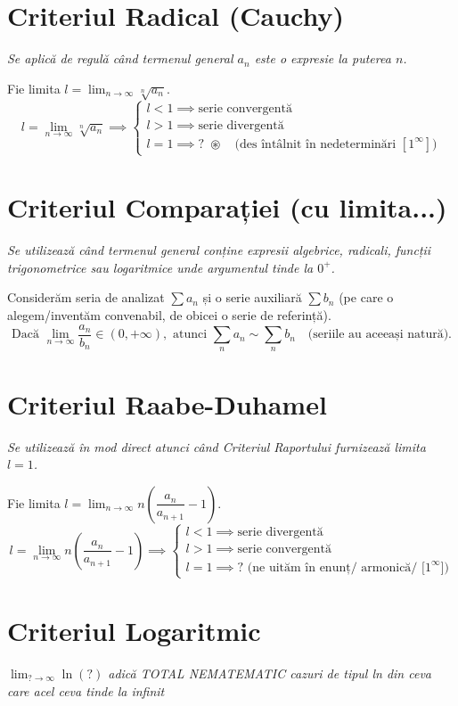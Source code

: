 \documentclass[12pt, a4paper]{report}
\begin{document}
	\section{Criteriul Radical (Cauchy)}
	\textit{Se aplică de regulă când termenul general $a_n$ este o expresie la puterea $n$.}
	
	Fie limita $l = \lim_{n \to \infty} \sqrt[n]{a_n}$.
	\[
	l = \lim_{n \to \infty} \sqrt[n]{a_n} \implies 
	\begin{cases} 
		l < 1 \implies \text{serie convergentă} \\ 
		l > 1 \implies \text{serie divergentă} \\ 
		l = 1 \implies \text{? } \circledast \quad \text{(des întâlnit în nedeterminări } [1^\infty]\text{)}
	\end{cases}
	\]
	
	\section{Criteriul Comparației (cu limita...)}
	\textit{Se utilizează când termenul general conține expresii algebrice, radicali, funcții trigonometrice sau logaritmice unde argumentul tinde la $0^+$.}
	
	Considerăm seria de analizat $\sum a_n$ și o serie auxiliară $\sum b_n$ (pe care o alegem/inventăm convenabil, de obicei o serie de referință).
	\[
	\text{Dacă } \lim_{n \to \infty} \frac{a_n}{b_n} \in (0, +\infty), \text{ atunci } \sum_{n} a_n \sim \sum_{n} b_n \quad \text{(seriile au aceeași natură).}
	\]
	
	\section{Criteriul Raabe-Duhamel} \label{sec:raabe}
	\textit{Se utilizează în mod direct atunci când Criteriul Raportului furnizează limita $l = 1$.}
	
	Fie limita $l = \lim_{n \to \infty} n \left( \dfrac{a_n}{a_{n+1}} - 1 \right)$.
	\[
	l = \lim_{n \to \infty} n \left( \frac{a_n}{a_{n+1}} - 1 \right) \implies 
	\begin{cases} 
		l < 1 \implies \text{serie divergentă} \\ 
		l > 1 \implies \text{serie convergentă} \\ 
		l = 1 \implies \text{? (ne uităm în enunț/ armonică/ [$1^\infty$])}
	\end{cases}
	\]
	
	\section{Criteriul Logaritmic}
	\textit{$\lim_{? \to \infty} \ln(?)$ adică TOTAL NEMATEMATIC cazuri de tipul ln din ceva care acel ceva tinde la infinit}
	
\end{document}
